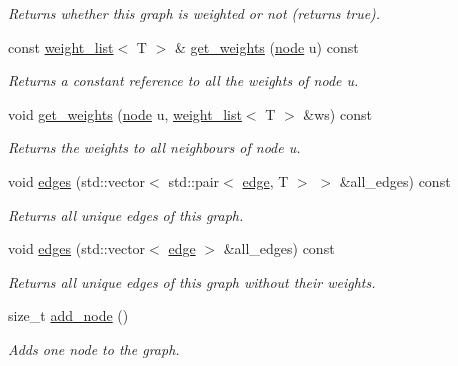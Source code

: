 \begin{DoxyCompactItemize}
\begin{DoxyCompactList}\small\item\em Returns whether this graph is weighted or not (returns true). \end{DoxyCompactList}\item 
const \hyperlink{namespacelgraph_a1e0fd5ef0a78b2a92da48adbed265cb6}{weight\-\_\-list}$<$ T $>$ \& \hyperlink{classlgraph_1_1wxgraph_a466944795f3d3399a633bd3ea5d3700b}{get\-\_\-weights} (\hyperlink{namespacelgraph_a397169dd66adf725210a30fb7251773e}{node} u) const 
\begin{DoxyCompactList}\small\item\em Returns a constant reference to all the weights of node {\itshape u}. \end{DoxyCompactList}\item 
void \hyperlink{classlgraph_1_1wxgraph_a17e6e4f50473631e789631efc029f1ea}{get\-\_\-weights} (\hyperlink{namespacelgraph_a397169dd66adf725210a30fb7251773e}{node} u, \hyperlink{namespacelgraph_a1e0fd5ef0a78b2a92da48adbed265cb6}{weight\-\_\-list}$<$ T $>$ \&ws) const 
\begin{DoxyCompactList}\small\item\em Returns the weights to all neighbours of node {\itshape u}. \end{DoxyCompactList}\item 
void \hyperlink{classlgraph_1_1wxgraph_aed7f8e1486d9e2352fc1891521913b4f}{edges} (std\-::vector$<$ std\-::pair$<$ \hyperlink{namespacelgraph_a76bd7d50719f03de7a85db259d80d572}{edge}, T $>$ $>$ \&all\-\_\-edges) const 
\begin{DoxyCompactList}\small\item\em Returns all unique edges of this graph. \end{DoxyCompactList}\item 
void \hyperlink{classlgraph_1_1wxgraph_a3bbf2166098254bff81889f42a334b4e}{edges} (std\-::vector$<$ \hyperlink{namespacelgraph_a76bd7d50719f03de7a85db259d80d572}{edge} $>$ \&all\-\_\-edges) const 
\begin{DoxyCompactList}\small\item\em Returns all unique edges of this graph without their weights. \end{DoxyCompactList}\item 
size\-\_\-t \hyperlink{classlgraph_1_1xxgraph_a6cb21d5e52afbb438a3e6643998c40cf}{add\-\_\-node} ()
\begin{DoxyCompactList}\small\item\em Adds one node to the graph. \end{DoxyCompactList}\item 

\end{DoxyCompactItemize}
